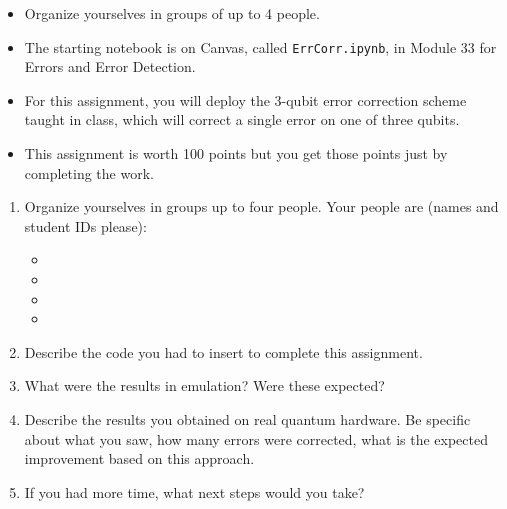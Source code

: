 \documentclass[12pt]{article}
\begin{document}

\begin{itemize}
    \item Organize yourselves in groups of up to 4 people.
    \item The starting notebook is on Canvas, called \texttt{ErrCorr.ipynb}, in Module 33 for Errors and Error Detection.
    \item For this assignment, you will deploy the 3-qubit error correction scheme taught in class, which will correct a single \PauliX{} error on one of three qubits.
    \item This assignment is worth 100 points but you get those points just by completing the work.
\end{itemize}

\begin{enumerate}[font=\bfseries]

\item Organize yourselves in groups up to four people.  Your people are (names and student IDs please):
\begin{itemize}
    \item \Blank[4in]{}
    \item \Blank[4in]{}
    \item \Blank[4in]{}
    \item \Blank[4in]{}
\end{itemize}
\item Describe the code you had to insert to complete this assignment.
\LeaveSpace[3in]{}
\item What were the results in emulation?  Were these expected?
\LeaveSpace[4in]{}
\item Describe the results you obtained on real quantum hardware.  Be specific about what you saw, how many errors were corrected, what is the expected improvement based on this approach.
\LeaveSpace[4in]{}

\item If you had more time, what next steps would you take?
\end{enumerate}
\end{document}

